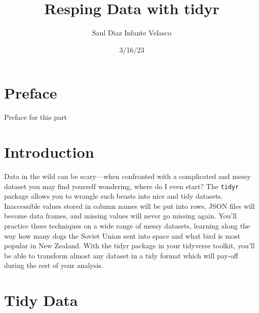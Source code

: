 \documentclass[
  letterpaper,
  DIV=11,
  numbers=noendperiod]{scrreprt}
\title{Resping Data with tidyr}
\author{Saul Diaz Infante Velasco}
\date{3/16/23}
\renewcommand*\contentsname{Table of contents}
\newcommand\contentsname{Table of contents}
\begin{document}
\maketitle
\ifdefined\Shaded\renewenvironment{Shaded}{\begin{tcolorbox}[breakable, borderline west={3pt}{0pt}{shadecolor}, enhanced, interior hidden, frame hidden, sharp corners, boxrule=0pt]}{\end{tcolorbox}}\fi

\renewcommand*\contentsname{Table of contents}
{
\hypersetup{linkcolor=}
\setcounter{tocdepth}{2}
\tableofcontents
}

\hypertarget{preface}{%
\chapter*{Preface}\label{preface}}


Preface for this part


\hypertarget{introduction}{%
\chapter*{Introduction}\label{introduction}}


Data in the wild can be scary---when confronted with a complicated and
messy dataset you may find yourself wondering, where do I even start?
The \texttt{tidyr} package allows you to wrangle such beasts into nice
and tidy datasets. Inaccessible values stored in column names will be
put into rows, JSON files will become data frames, and missing values
will never go missing again. You'll practice these techniques on a wide
range of messy datasets, learning along the way how many dogs the Soviet
Union sent into space and what bird is most popular in New Zealand. With
the tidyr package in your tidyverse toolkit, you'll be able to transform
almost any dataset in a tidy format which will pay-off during the rest
of your analysis.


\hypertarget{tidy-data}{%
\chapter{Tidy Data}\label{tidy-data}}
\end{document}
